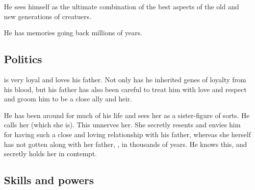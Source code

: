 He sees himself as the ultimate combination of the best aspects of the old and new generations of creatuers. 



He has memories going back millions of years. 








\subsection{Politics}

\Vizsherioch{} is very loyal and loves his father. Not only has he inherited genes of loyalty from his \bane{} blood, but his father has also been careful to treat him with love and respect and groom him to be a close ally and heir. 

He has been around  for much of his life and sees her as a sister-figure of sorts. 
He calls her  (which she is). 
This unnerves her. 
She secretly resents and envies him for having such a close and loving relationship with his father, whereas she herself has not gotten along with her father, \Ishnaruchaefir, in thousands of years. He knows this, and secretly holds her in contempt. 









\subsection{Skills and powers}





